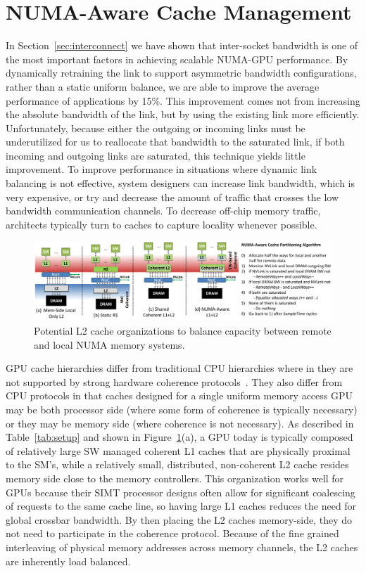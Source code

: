 \section{NUMA-Aware Cache Management}
\label{caching}
In Section~\ref{sec:interconnect} we have shown that inter-socket bandwidth is one
of the most important factors in achieving scalable NUMA-GPU performance. By
dynamically retraining the link to support asymmetric bandwidth configurations,
rather than a static uniform balance, we are able to improve the average performance
of applications by 15\%.  This improvement comes not from increasing the
absolute bandwidth of the link, but by using the existing link more efficiently.
Unfortunately, because either the outgoing or incoming links must be underutilized
for us to reallocate that bandwidth to the saturated link, if both incoming and
outgoing links are saturated, this technique yields little improvement.
To improve performance in situations where dynamic link balancing is not effective,
system designers can increase link bandwidth, which is very expensive,
or try and decrease the amount of traffic that crosses the low bandwidth
communication channels.  To decrease off-chip memory traffic, architects typically
turn to caches to capture locality whenever possible.

\begin{figure}[t]
    \centering
    \includegraphics[width=1.0\textwidth]{figures/cache_configurations_static_dynamic.pdf}
    \caption{Potential L2 cache organizations to balance capacity between remote and
    local NUMA memory systems.}
    \label{fig:cacheorg}
\end{figure}

GPU cache hierarchies differ from traditional CPU hierarchies where in they 
are not supported by strong hardware coherence protocols~\cite{Singh2013}. 
They also differ from CPU protocols in that caches designed for a single 
uniform memory access GPU may be both processor side (where some form of 
coherence is typically necessary) or they may be memory side (where coherence 
is not necessary).  As described in Table~\ref{tab:setup} and shown in 
Figure~\ref{fig:cacheorg}(a), a GPU today is typically composed of relatively 
large SW managed coherent L1 caches that are physically proximal to the SM's, 
while a relatively small, distributed, non-coherent L2 cache resides memory 
side close to the memory controllers.  This organization works well for GPUs 
because their SIMT processor designs often allow for significant coalescing 
of requests to the same cache line, so having large L1 caches reduces the 
need for global crossbar bandwidth.  By then placing the L2 caches 
memory-side, they do not need to participate in the coherence protocol.  
Because of the fine grained interleaving of physical memory addresses across 
memory channels, the L2 caches are inherently load balanced.

